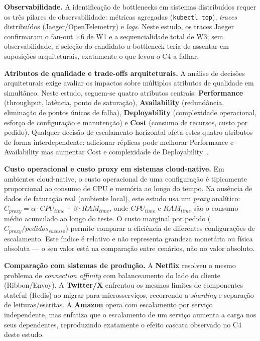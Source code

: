 \documentclass[manuscript,screen,review]{acmart}
\begin{document}
\textbf{Observabilidade.} A identificação de bottlenecks em sistemas distribuídos requer os três pilares de observabilidade: métricas agregadas (\texttt{kubectl top}), \textit{traces} distribuídos (Jaeger/OpenTelemetry) e \textit{logs}. Neste estudo, os traces Jaeger confirmaram o fan-out ×6 de W1 e a sequencialidade total de W3; sem observabilidade, a seleção do candidato a bottleneck teria de assentar em suposições arquiteturais, exatamente o que levou o C4 a falhar.

\textbf{Atributos de qualidade e trade-offs arquiteturais.} A análise de decisões arquiteturais exige avaliar os impactos sobre múltiplos atributos de qualidade em simultâneo. Neste estudo, seguem-se quatro atributos centrais: \textbf{Performance} (throughput, latência, ponto de saturação), \textbf{Availability} (redundância, eliminação de pontos únicos de falha), \textbf{Deployability} (complexidade operacional, esforço de configuração e manutenção) e \textbf{Cost} (consumo de recursos, custo por pedido). Qualquer decisão de escalamento horizontal afeta estes quatro atributos de forma interdependente: adicionar réplicas pode melhorar Performance e Availability mas aumentar Cost e complexidade de Deployability~\cite{newman}.

\textbf{Custo operacional e custo proxy em sistemas cloud-native.} Em ambientes cloud-native, o custo operacional de uma configuração é tipicamente proporcional ao consumo de CPU e memória ao longo do tempo. Na ausência de dados de faturação real (ambiente local), este estudo usa um \textit{proxy} analítico: $C_{proxy} = \alpha \cdot CPU_{time} + \beta \cdot RAM_{time}$, onde $CPU_{time}$ e $RAM_{time}$ são o consumo médio acumulado ao longo do teste. O custo marginal por pedido ($C_{proxy}/pedidos_{sucesso}$) permite comparar a eficiência de diferentes configurações de escalamento. Este índice é relativo e não representa grandeza monetária ou física absoluta — o seu valor está na comparação entre cenários, não no valor absoluto.

\textbf{Comparação com sistemas de produção.} A \textbf{Netflix} resolveu o mesmo problema de \textit{connection affinity} com balanceamento do lado do cliente (Ribbon/Envoy). A \textbf{Twitter/X} enfrentou os mesmos limites de componentes stateful (Redis) ao migrar para microsserviços, recorrendo a \textit{sharding} e separação de leituras/escritas. A \textbf{Amazon} opera com escalamento por serviço independente, mas enfatiza que o escalamento de um serviço aumenta a carga nos seus dependentes, reproduzindo exatamente o efeito cascata observado no C4 deste estudo.
\end{document}
